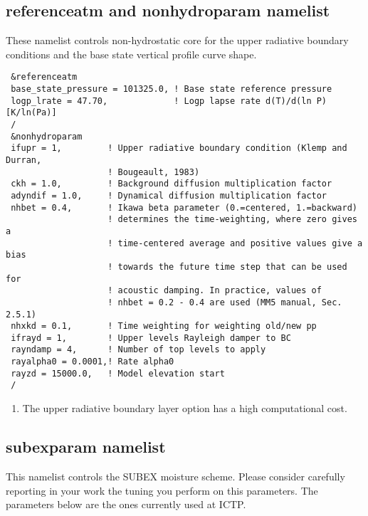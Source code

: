 \subsection{referenceatm and nonhydroparam namelist}

These namelist controls non-hydrostatic core for the upper radiative boundary
conditions and the base state vertical profile curve shape.

{\footnotesize
\begin{Verbatim}
 &referenceatm
 base_state_pressure = 101325.0, ! Base state reference pressure
 logp_lrate = 47.70,             ! Logp lapse rate d(T)/d(ln P) [K/ln(Pa)]
 /
 &nonhydroparam
 ifupr = 1,         ! Upper radiative boundary condition (Klemp and Durran,
                    ! Bougeault, 1983)
 ckh = 1.0,         ! Background diffusion multiplication factor
 adyndif = 1.0,     ! Dynamical diffusion multiplication factor
 nhbet = 0.4,       ! Ikawa beta parameter (0.=centered, 1.=backward)
                    ! determines the time-weighting, where zero gives a
                    ! time-centered average and positive values give a bias
                    ! towards the future time step that can be used for
                    ! acoustic damping. In practice, values of
                    ! nhbet = 0.2 - 0.4 are used (MM5 manual, Sec. 2.5.1)
 nhxkd = 0.1,       ! Time weighting for weighting old/new pp
 ifrayd = 1,        ! Upper levels Rayleigh damper to BC
 rayndamp = 4,      ! Number of top levels to apply
 rayalpha0 = 0.0001,! Rate alpha0
 rayzd = 15000.0,   ! Model elevation start
 /
\end{Verbatim}
}

\begin{enumerate}
\item The upper radiative boundary layer option has a high computational cost.
\end{enumerate}

\subsection{subexparam namelist}

This namelist controls the SUBEX moisture scheme. Please consider carefully
reporting in your work the tuning you perform on this parameters.
The parameters below are the ones currently used at ICTP.

